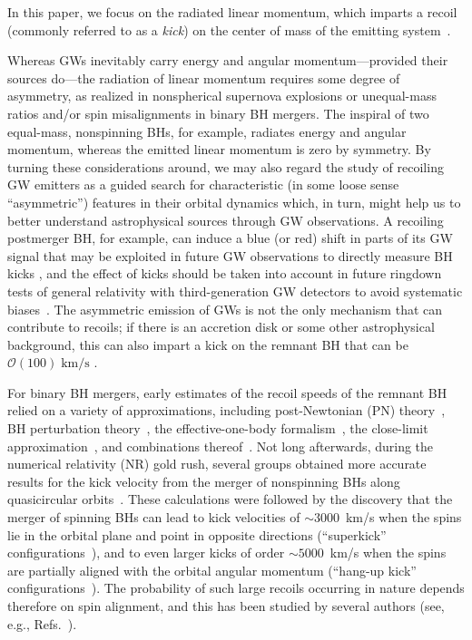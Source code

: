 In this paper, we focus on the radiated linear momentum, which
imparts a recoil (commonly referred to as a \emph{kick}) on the center
of mass of the emitting
system~\cite{Bonnor1961-wy,Peres:1962zz,Bekenstein:1973zz}.

Whereas GWs inevitably carry energy and angular momentum---provided
their sources do---the radiation of linear momentum requires some
degree of asymmetry, as realized in nonspherical supernova explosions
or unequal-mass ratios and/or spin misalignments in binary BH
mergers. The inspiral of two equal-mass, nonspinning BHs, for example,
radiates energy and angular momentum, whereas the emitted linear
momentum is zero by symmetry. By turning these considerations around,
we may also regard the study of recoiling GW emitters as a guided
search for characteristic (in some loose sense ``asymmetric'')
features in their orbital dynamics which, in turn, might help us to
better understand astrophysical sources through GW observations.
A recoiling postmerger BH, for example, can induce a blue (or
red) shift in parts of its GW signal that may be exploited in future
GW observations to directly measure BH kicks
\cite{Gerosa:2016vip,CalderonBustillo:2018zuq,Lousto:2019lyf}, and
the effect of kicks should be taken into account in future ringdown
tests of general relativity with third-generation GW detectors to
avoid systematic biases~\cite{Varma:2020nbm}.
The asymmetric emission of GWs is not the only mechanism that 
can contribute to recoils; if there is an accretion disk or some other
astrophysical background, this can also impart a kick on the remnant
BH that can be $\mathcal{O}(100)\;\mathrm{km/s}$ \cite{Cardoso:2020lxx}.

For binary BH mergers, early estimates of the recoil speeds of the
remnant BH relied on a variety of approximations, including
post-Newtonian (PN) theory~\cite{Fitchett1983-xq,Blanchet:2005rj}, BH
perturbation theory~\cite{Hughes:2004ck}, the effective-one-body
formalism~\cite{Damour:2006tr}, the close-limit
approximation~\cite{Sopuerta:2006wj,Sopuerta:2006et}, and combinations
thereof~\cite{LeTiec:2009yg}. Not long afterwards, during the
numerical relativity (NR) gold rush, several groups obtained more
accurate results for the kick velocity from the merger of nonspinning
BHs along
quasicircular
orbits~\cite{Baker:2006vn,Gonzalez:2006md,Herrmann:2007cwl}.
These calculations were followed by the discovery that the merger of
spinning BHs can lead to kick velocities of $\sim 3000$~km/s when the
spins lie in the orbital plane and point in opposite directions
(``superkick''
configurations~\cite{Gonzalez:2007hi,Campanelli:2007cga,Campanelli:2007ew}),
and to even larger kicks of order $\sim 5000$~km/s when the spins are
partially aligned with the orbital angular momentum (``hang-up kick''
configurations~\cite{Lousto:2011kp}). 
The probability of such large
recoils occurring in nature depends therefore on spin alignment, and
this has been studied by several authors (see, e.g.,
Refs.~\cite{Schnittman:2007sn,Dotti:2009vz,Kesden:2010ji,Lousto:2012su,Berti:2012zp,Lousto:2012su}).

